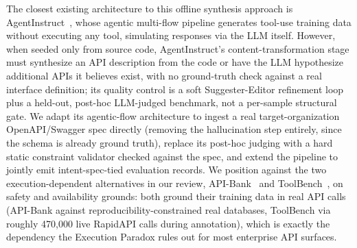 \documentclass[11pt]{article}
\begin{document}
The closest existing architecture to this offline synthesis approach is
AgentInstruct~\cite{mitra2024agentinstruct}, whose agentic multi-flow pipeline generates tool-use
training data without executing any tool, simulating responses via the LLM itself. However, when
seeded only from source code, AgentInstruct's content-transformation stage must synthesize an API
description from the code or have the LLM hypothesize additional APIs it believes exist, with no
ground-truth check against a real interface definition; its quality control is a soft
Suggester-Editor refinement loop plus a held-out, post-hoc LLM-judged benchmark, not a per-sample
structural gate. We adapt its agentic-flow architecture to ingest a real target-organization
OpenAPI/Swagger spec directly (removing the hallucination step entirely, since the schema is
already ground truth), replace its post-hoc judging with a hard static constraint validator checked
against the spec, and extend the pipeline to jointly emit intent-spec-tied evaluation records. We
position against the two execution-dependent alternatives in our review, API-Bank~\cite{li2023apibank}
and ToolBench~\cite{qin2023toolbench}, on safety and availability grounds: both ground their
training data in real API calls (API-Bank against reproducibility-constrained real databases,
ToolBench via roughly 470,000 live RapidAPI calls during annotation), which is exactly the
dependency the Execution Paradox rules out for most enterprise API surfaces.
\end{document}
